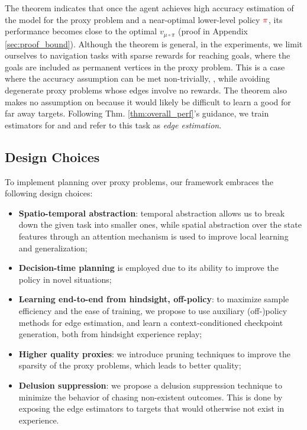 The theorem indicates that once the agent achieves high accuracy estimation of the model for the proxy problem and a near-optimal lower-level policy $\textcolor{red}{\pi}$, its performance becomes close to the optimal $v_{\mu \circ \pi}$ (proof in Appendix \ref{sec:proof_bound}). Although the theorem is general, in the experiments, we limit ourselves to %
navigation tasks with sparse rewards for reaching goals, where the goals are included as permanent vertices in the proxy problem. This is a case where the accuracy assumption can be met non-trivially, \ie{}, while avoiding degenerate proxy problems whose edges involve no rewards. The theorem also makes no assumption on \red{$\pi$} because it would likely be difficult to learn a good \red{$\pi$} for far away targets. Following Thm. \ref{thm:overall_perf}'s guidance, we train estimators for  and \blue{$\gamma_\pi$} and refer to this task as \textit{edge estimation}.

\subsection{Design Choices}
To implement planning over proxy problems, our framework embraces the following design choices:

\begin{itemize}[label={},leftmargin=*]
\item \textbf{Spatio-temporal abstraction}: temporal abstraction allows us to break down the given task into smaller ones, while spatial abstraction over the state features through an attention mechanism is used to improve local learning and generalization;

\item \textbf{Decision-time planning} is employed due to its ability to improve the policy in novel situations;

\item \textbf{Learning end-to-end from hindsight, off-policy}: to maximize sample efficiency and the ease of training, we propose to use auxiliary (off-)policy methods for edge estimation, and learn a context-conditioned checkpoint generation, both from hindsight experience replay;

\item \textbf{Higher quality proxies}: we introduce pruning techniques to improve the sparsity of the proxy problems, which leads to better quality;

\item \textbf{Delusion suppression}: we propose a delusion suppression technique to minimize the behavior of chasing non-existent outcomes. This is done by exposing the edge estimators to targets that would otherwise not exist in experience.
\end{itemize}

